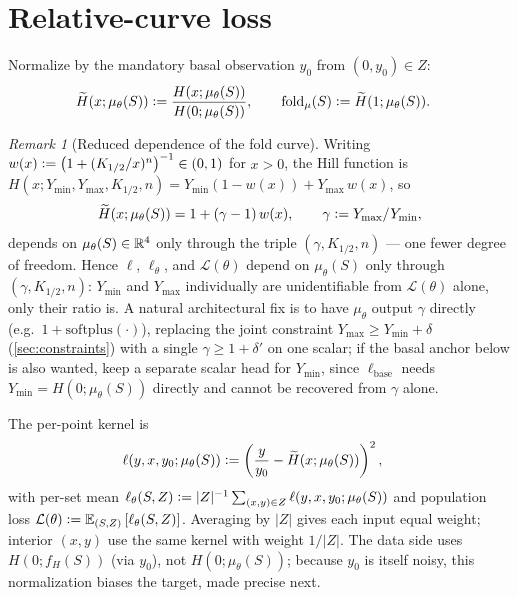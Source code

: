 \documentclass{article}
\theoremstyle{plain}
\theoremstyle{remark}
\newtheorem*{rmk}{Remark}
\begin{document}
\section{Relative-curve loss}\label{sec:relative-curve}
Normalize by the mandatory basal observation $y_0$ from $(0,y_0)\in Z$:
\begin{align*}
    \widetilde{H}(x;\mu_{\theta}(S))
     & \defeq \frac{H(x;\mu_{\theta}(S))}{H(0;\mu_{\theta}(S))},
    \qquad
    \mathrm{fold}_\mu(S) \defeq \widetilde{H}(1;\mu_{\theta}(S)).
\end{align*}
\begin{rmk}[Reduced dependence of the fold curve]
Writing $w(x)\defeq\big(1+(K_{1/2}/x)^n\big)^{-1}\in(0,1)$ for $x>0$, the Hill function is $H(x;Y_{\min},Y_{\max},K_{1/2},n)=Y_{\min}(1-w(x))+Y_{\max}\,w(x)$, so
\[
    \widetilde{H}(x;\mu_{\theta}(S)) = 1+(\gamma-1)\,w(x), \qquad \gamma\defeq Y_{\max}/Y_{\min},
\]
depends on $\mu_{\theta}(S)\in\RR^4$ only through the triple $(\gamma,K_{1/2},n)$ — one fewer degree of freedom. Hence $\ell$, $\ell_{\theta}$, and $\mathcal{L}(\theta)$ depend on $\mu_{\theta}(S)$ only through $(\gamma,K_{1/2},n)$: $Y_{\min}$ and $Y_{\max}$ individually are unidentifiable from $\mathcal{L}(\theta)$ alone, only their ratio is. A natural architectural fix is to have $\mu_{\theta}$ output $\gamma$ directly (e.g.\ $1+\mathrm{softplus}(\cdot)$), replacing the joint constraint $Y_{\max}\ge Y_{\min}+\delta$ (\cref{sec:constraints}) with a single $\gamma\ge1+\delta'$ on one scalar; if the basal anchor below is also wanted, keep a separate scalar head for $Y_{\min}$, since $\ell_{\mathrm{base}}$ needs $Y_{\min}=H(0;\mu_{\theta}(S))$ directly and cannot be recovered from $\gamma$ alone.
\end{rmk}
The per-point kernel is
\begin{align*}
    \ell(y,x,y_0;\mu_{\theta}(S))
     & \defeq \left(\frac{y}{y_0} - \widetilde{H}(x;\mu_{\theta}(S))\right)^2,
\end{align*}
with per-set mean $\ell_{\theta}(S,Z)\defeq |Z|^{-1}\sum_{(x,y)\in Z}\ell(y,x,y_0;\mu_{\theta}(S))$ and population loss $\mathcal{L}(\theta)\defeq\expect[(S,Z)]{\ell_{\theta}(S,Z)}$.
Averaging by $|Z|$ gives each input equal weight; interior $(x,y)$ use the same kernel with weight $1/|Z|$.
The data side uses $H(0;f_H(S))$ (via $y_0$), not $H(0;\mu_{\theta}(S))$; because $y_0$ is itself noisy, this normalization biases the target, made precise next.
\end{document}
